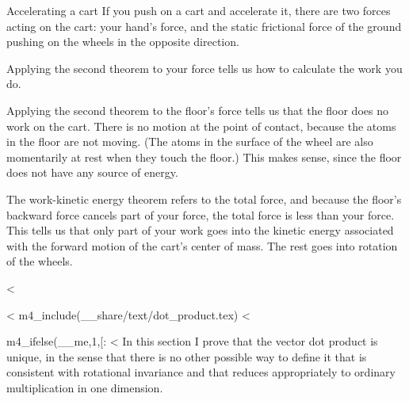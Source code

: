 \begin{eg}{Accelerating a cart}
If you push on a cart and accelerate it, there are two
forces acting on the cart: your hand's force, and the static
frictional force of the ground pushing on the wheels in
the opposite direction.

Applying the second theorem to your force tells us how to
calculate the work you do.

Applying the second theorem to the floor's force tells us
that the floor does no work on the cart. There is no motion
at the point of contact, because the atoms in the floor are
not moving. (The atoms in the surface of the wheel are also
momentarily at rest when they touch the floor.) This makes
sense, since the floor does not have any source of energy.

The work-kinetic energy theorem refers to the total force,
and because the floor's backward force cancels part of your
force, the total force is less than your force. This tells
us that only part of your work goes into the kinetic energy
associated with the forward motion of the cart's center of
mass. The rest goes into rotation of the wheels.
\end{eg}

<%

<%
  m4_include(__share/text/dot_product.tex)
<%

m4_ifelse(__me,1,[:
<%
        In this section I prove that the vector dot product is unique, in the sense that there is
        no other possible way to define it that is consistent with rotational invariance and that
        reduces appropriately to ordinary multiplication in one dimension.

